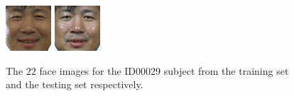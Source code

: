 \begin{figure}
\begin{center}
{\includegraphics[width=\columnwidth/12]{ch5/figures/00029_960620_fb.png}
\includegraphics[width=\columnwidth/12]{ch5/figures/00029_960627_fb.png}}
  \caption{The $22$ face images for the ID00029 subject from the training set and the testing set respectively.}
\label{fig:ferettrainingandtesting}
 \end{center}
\end{figure} 

